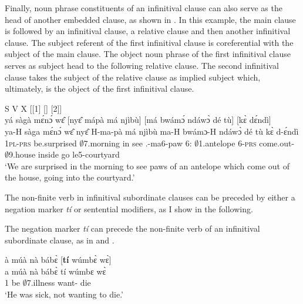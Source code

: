 Finally, noun phrase constituents of an infinitival clause can also serve as the head of another embedded clause, as shown in . In this example, the main clause is followed by an infinitival clause, a relative clause and then another infinitival clause. The subject referent of the first infinitival clause is coreferential with the subject of the main clause. The object noun phrase of the first infinitival clause serves as subject head to the following relative clause. The second infinitival clause takes the subject of the relative clause as implied subject which, ultimately, is the object of the first infinitival clause.


\ea\label{INFpost5} S V X [[{\INF}1] [{\REL}] [{\INF}2]]\\
  \glll   yá sàgà mɛ́nɔ́ wɛ̂ [nyɛ̂ mápà má njìbù]\textsubscript{{\SUB}} [má bwámɔ́ ndáwɔ̀ dé tù]\textsubscript{{\REL}} [kɛ̀ dɛ́ndì]\textsubscript{{\INF}} \\
          ya-H sàga mɛ́nɔ́ wɛ̂ {\db}nyɛ̂ H-ma-pà má njìbù {\db}ma-H bwámɔ-H ndáwɔ̀ dé tù {\db}kɛ̀ d-ɛ́ndì \\
        1\textsc{pl}-\textsc{prs} be.surprised $\emptyset$7.morning in {\db}see {\OBJ}.{\LINK}-ma6-paw 6:{\ATT} $\emptyset$1.antelope {\db}6-\textsc{prs} come.out-{\R} $\emptyset$9.house {\LOC} inside {\db}go le5-courtyard \\
    \trans `We are surprised in the morning to see paws of an antelope which come out of the house, going into the courtyard.'
\z




The non-finite verb in infinitival subordinate clauses can be preceded by either a negation marker {\itshape tí} or sentential modifiers, as I show in the following.

The negation marker {\itshape tí} can precede the non-finite verb of an infinitival subordinate clause, as in  and .



\ea\label{InfAdv1} 
  \glll  à múà nà bábɛ̀ [{\bfseries tí} wúmbɛ̀ wɛ̀]\textsubscript{{\SUB}} \\
          a múà nà bábɛ̀ {\db}tí wúmbɛ wɛ̀   \\
         1 be {\COM} $\emptyset$7.illness {\db}{\NEG} want-{\R} die \\
    \trans `He was sick, not wanting to die.'
\z

